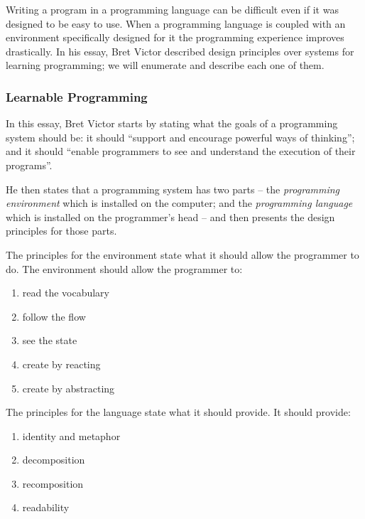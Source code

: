 \documentclass{./llncs2e/llncs}
\begin{document}
Writing a program in a programming language can be difficult even if it was designed to be easy to use. When a programming language is coupled with an environment specifically designed for it the programming experience improves drastically. In his essay\cite{victor2012learnable}, Bret Victor described design principles over systems for learning programming; we will enumerate and describe each one of them.

\subsubsection{Learnable Programming\cite{victor2012learnable}}
In this essay, Bret Victor starts by stating what the goals of a programming system should be: it should ``support and encourage powerful ways of thinking''; and it should ``enable programmers to see and understand the execution of their programs''.

He then states that a programming system has two parts -- the \emph{programming environment} which is installed on the computer; and the \emph{programming language} which is installed on the programmer's head -- and then presents the design principles for those parts.

The principles for the environment state what it should allow the programmer to do. The environment should allow the programmer to:
\begin{enumerate}
	\item \label{lp:env:read} read the vocabulary 
	\item \label{lp:env:flow} follow the flow
	\item \label{lp:env:state} see the state
	\item \label{lp:env:react} create by reacting
	\item \label{lp:env:abstr} create by abstracting
\end{enumerate}

The principles for the language state what it should provide. It should provide:
\begin{enumerate}
	\item \label{lp:lang:id} identity and metaphor
	\item \label{lp:lang:decom} decomposition
	\item \label{lp:lang:recom} recomposition
	\item \label{lp:lang:read} readability
\end{enumerate}
\end{document}
